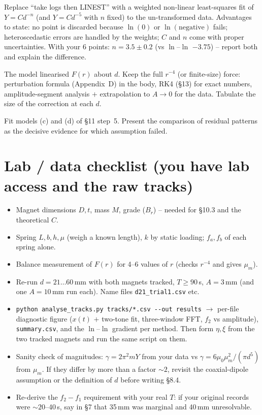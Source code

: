 \documentclass[11pt,a4paper]{article}
\newcommand{\Y}{Y}                                   %
\newcommand{\muz}{\mu_0}
\newcommand{\mum}{\mu_m}
\begin{document}
\begin{description}[style=nextline]
\item[Level 1 -- analysis (cheap, do it now).] Replace ``take logs then LINEST'' with a
weighted non-linear least-squares fit of $\Y=C d^{-n}$ (and $\Y=Cd^{-5}$ with $n$ fixed) to
the un-transformed data. Advantages to state: no point is discarded because $\ln(0)$ or
$\ln(\text{negative})$ fails; heteroscedastic errors are handled by the weights; $C$ and
$n$ come with proper uncertainties. With your 6 points: $n=3.5\pm0.2$ (vs $\ln$--$\ln$
$-3.75$) -- report both and explain the difference.
\item[Level 2 -- physics (the systematic-error story).] The model linearised $F(r)$ about
$d$. Keep the full $r^{-4}$ (or finite-size) force: perturbation formula (Appendix~D) in
the body, RK4 (\S13) for exact numbers, amplitude-segment analysis $+$ extrapolation to
$A\to0$ for the data. Tabulate the size of the correction at each $d$.
\item[Level 3 -- model (finite size $+$ detuning).] Fit models (c) and (d) of \S11
step~5. Present the comparison of residual patterns as the decisive evidence for which
assumption failed.
\end{description}

\section{Lab / data checklist (you have lab access and the raw tracks)}

\begin{itemize}[label=$\square$]
\item Magnet dimensions $D,t$, mass $M$, grade ($B_r$) -- needed for \S10.3 and the theoretical $C$.
\item Spring $L,b,h,\mu$ (weigh a known length), $k$ by static loading; $f_a,f_b$ of each spring alone.
\item Balance measurement of $F(r)$ for 4--6 values of $r$ (checks $r^{-4}$ and gives $\mum$).
\item Re-run $d=21\ldots60$\,mm with both magnets tracked, $T\ge90$\,s, $A=3$\,mm (and one
$A=10$\,mm run each). Name files \texttt{d21\_trial1.csv} etc.
\item \texttt{python analyse\_tracks.py \textquotedbl tracks/*.csv\textquotedbl{} -\/-out results} $\to$ per-file
diagnostic figure ($x(t)$ $+$ two-tone fit, three-window FFT, $f_2$ vs amplitude),
\texttt{summary.csv}, and the $\ln$--$\ln$ gradient per method. Then form $\eta,\xi$ from
the two tracked magnets and run the same script on them.
\item Sanity check of magnitudes: $\gamma=2\pi^2 m\Y$ from your data vs
$\gamma=6\muz\mum^2/(\pi d^5)$ from $\mum$. If they differ by more than a factor $\sim2$,
revisit the coaxial-dipole assumption or the definition of $d$ before writing \S8.4.
\item Re-derive the $f_2-f_1$ requirement with your real $T$: if your original records were
$\sim20$--40\,s, say in \S7 that 35\,mm was marginal and 40\,mm unresolvable.
\end{itemize}
\end{document}

